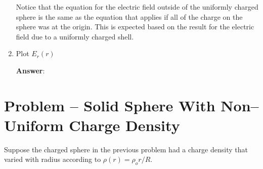 \documentclass{article}
\begin{document}
\begin{enumerate}
        Notice that the equation for the electric field outside of the uniformly charged sphere is the same as the equation that applies if all of the charge on the sphere was at the origin. This is expected based on the result for the electric field due to a uniformly charged shell.
        \else
        \vskip 96pt
        \fi

  \item Plot $E_r(r)$

        \ifsolutions
        \textbf{Answer}:

        
        \else
        \vskip 96pt
        \fi

\end{enumerate}

\section{Problem -- Solid Sphere With Non--Uniform Charge Density}

Suppose the charged sphere in the previous problem had a charge density that varied with radius according to $\rho(r) = \rho_o r/R$.
\end{document}

